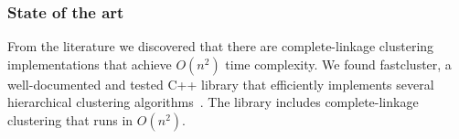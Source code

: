 \subsubsection*{State of the art}
From the literature we discovered that there are complete-linkage clustering implementations that achieve $O(n^2)$ time complexity.
We found fastcluster, a well-documented and tested C++ library that efficiently implements several hierarchical clustering algorithms~\cite{mullner2011modern, FastClust}.
The library includes complete-linkage clustering that runs in $O(n^2)$.


